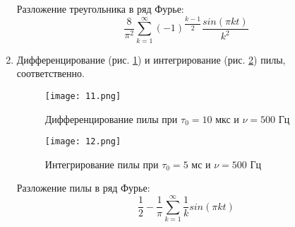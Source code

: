 \documentclass[a4paper]{article}
\begin{document}
\begin{enumerate}
    Разложение треугольника в ряд Фурье:
    \begin{equation*}
        \dfrac{8}{\pi^2}\sum\limits_{k=1}^{\infty}(-1)^{\dfrac{k-1}{2}}\dfrac{sin(\pi kt)}{k^2}
    \end{equation*}
    \item Дифференцирование (рис. \ref{Дифференцирование пилы при 10 мкс и 500 Гц})
    и интегрирование (рис. \ref{Интегрирование пилы при 5 мс и 500 Гц}) пилы,
    соответственно.
    \begin{figure}[h]
        \centering
        \texttt{[image: 11.png]}
        \caption{Дифференцирование пилы при $\tau_0 = 10$ мкс и $\nu = 500$ Гц}
        \label{Дифференцирование пилы при 10 мкс и 500 Гц}
    \end{figure}
    \begin{figure}[h]
        \centering
        \texttt{[image: 12.png]}
        \caption{Интегрирование пилы при $\tau_0 = 5$ мс и $\nu = 500$ Гц}
        \label{Интегрирование пилы при 5 мс и 500 Гц}
    \end{figure}

    Разложение пилы в ряд Фурье:
    \begin{equation*}
        \dfrac{1}{2} - \dfrac{1}{\pi}\sum\limits_{k=1}^{\infty}\dfrac{1}{k}sin(\pi kt)
    \end{equation*}
\end{enumerate}
\end{document}

